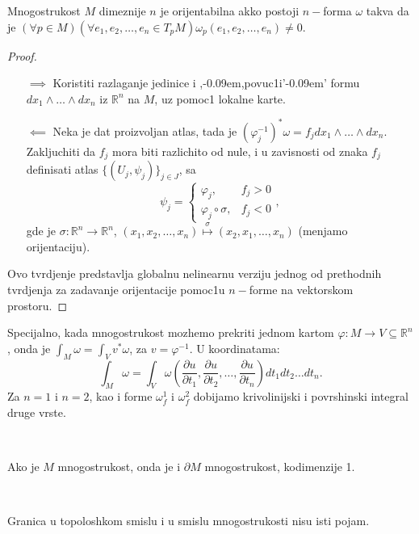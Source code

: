 \documentclass[a4paper,12pt]{article}
\newcommand{\RR}{\mathbb{R}}
\newcommand{\psj}{\subseteq}
\def\zn{,\kern-0.09em,} %
\def\zng{'\kern-0.09em' } %
\begin{document}
\begin{tvr}
	Mnogostrukost $M$ dimeznije $n$ je orijentabilna akko postoji $n-$forma $\omega$ takva da je
	$(\forall p \in M)(\forall e_1, e_2, \dotso, e_n \in T_p M)\omega_p (e_1, e_2, \dotso, e_n)\neq 0$.
\end{tvr}
\begin{proof}
	\begin{itemize}
		\item[$\implies$] Koristiti razlaganje jedinice i \zn povuc1i\zng formu $dx_1\wedge \dotso \wedge dx_n$ iz $\RR^n$ na $M$,
			uz pomoc1 lokalne karte.
		\item[$\impliedby$] Neka je dat proizvoljan atlas, tada je $(\varphi_j^{-1})^* \omega = f_j dx_1\wedge\dotso\wedge dx_n$.
			Zakljuchiti da $f_j$ mora biti razlichito od nule, i u zavisnosti od znaka $f_j$ definisati atlas $\{(U_j, \psi_j)\}_{j \in J}$, sa
			\[ \psi_j = \begin{cases}
				\varphi_j, &f_j > 0 \\
				\varphi_j \circ \sigma, &f_j < 0
			\end{cases} ,\] 
			gde je $\sigma:\RR^n \to \RR^n$, $(x_1, x_2, \dotso, x_n) \overset{\sigma}{\mapsto} (x_2, x_1, \dotso, x_n)$ (menjamo orijentaciju).
	\end{itemize}
	Ovo tvrdjenje predstavlja globalnu nelinearnu verziju jednog od prethodnih tvrdjenja za zadavanje orijentacije pomoc1u $n-$forme na 
	vektorskom prostoru.
\end{proof}

\begin{nap}
	Specijalno, kada mnogostrukost mozhemo prekriti jednom kartom $\varphi: M \to V\psj \RR^n$, onda je $\int_M \omega = \int_V v^* \omega$, za 
	$v = \varphi^{-1}$. U koordinatama:
	\[ \int_M \omega = \int_V \omega\left(\frac{\partial u}{\partial t_1}, \frac{\partial u}{\partial t_2}, \dotso, \frac{\partial u}{\partial t_n}\right)dt_1 dt_2 \dotso dt_n.\] 
	Za $n=1$ i $n=2$, kao i forme $\omega^1_f$ i $\omega^2_f$ dobijamo krivolinijski i povrshinski integral druge vrste.
\end{nap}\\

\begin{nap}
	Ako je $M$ mnogostrukost, onda je i $\partial M$ mnogostrukost, kodimenzije 1.
\end{nap}\\

\begin{nap}
	Granica u topoloshkom smislu i u smislu mnogostrukosti nisu isti pojam.
\end{nap}\\
\end{document}
